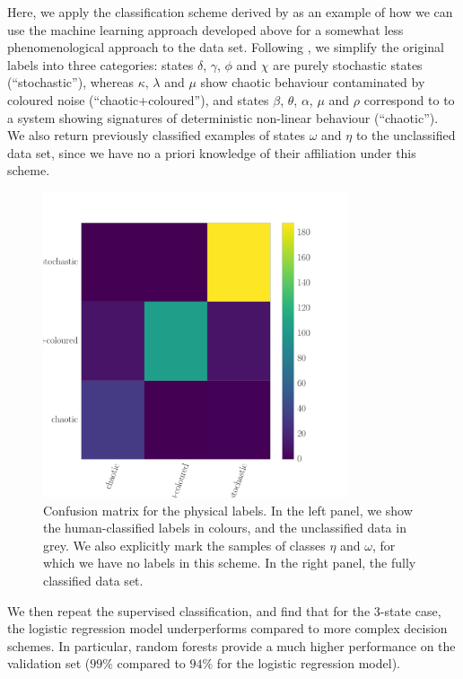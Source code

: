\documentclass[12pt]{emulateapj}
\begin{document}
Here, we apply the classification scheme derived by \citet{harikrishnan2011} as an example of how we can use the machine learning approach developed above 
for a somewhat less phenomenological approach to the data set. 
Following \citet{harikrishnan2011}, we simplify the original labels into three categories: states $\delta$, $\gamma$, $\phi$ and $\chi$ are purely stochastic states
(``stochastic''), whereas $\kappa$, $\lambda$ and $\mu$ show chaotic behaviour contaminated by coloured noise (``chaotic+coloured''), and states $\beta$, $\theta$, $\alpha$, $\mu$ and $\rho$ correspond to to a system showing signatures of deterministic non-linear behaviour (``chaotic'').
We also return previously classified examples of states $\omega$ and $\eta$ to the unclassified data set, since we have no a priori knowledge of their affiliation under this scheme.
\begin{figure}[htbp]
\begin{center}
\includegraphics[width=9cm]{grs1915_supervised_phys_cm.pdf}
\caption{Confusion matrix for the physical labels. In the left panel, we show the human-classified labels in colours, and the unclassified data in grey. We also 
explicitly mark the samples of classes $\eta$ and $\omega$, for which we have no labels in this scheme. In the right panel, the fully classified data set.} 
\label{fig:confusionmatrix_physical}
\end{center}
\end{figure}
We then repeat the supervised classification, and find that for the 3-state case, the logistic regression model underperforms compared to more complex decision schemes. In particular, random forests provide a much higher performance on the validation set ($99\%$ compared to $94\%$ for the logistic regression model). 
\end{document}

